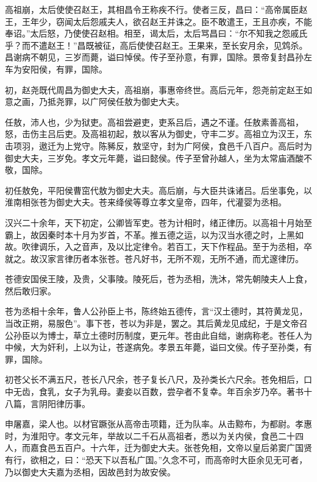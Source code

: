 \documentclass[12pt,UTF8]{ctexbook}
\begin{document}
高祖崩，太后使使召赵王，其相昌令王称疾不行。使者三反，昌曰：“高帝属臣赵王，王年少，窃闻太后怨戚夫人，欲召赵王并诛之。臣不敢遣王，王且亦疾，不能奉诏。”太后怒，乃使使召赵相。相至，谒太后，太后骂昌曰：“尔不知我之怨戚氏乎？而不遣赵王！”昌既被征，高后使使召赵王。王果来，至长安月余，见鸩杀。昌谢病不朝见，三岁而薨，谥曰悼侯。传子至孙意，有罪，国除。景帝复封昌孙左车为安阳侯，有罪，国除。



初，赵尧既代周昌为御史大夫，高祖崩，事惠帝终世。高后元年，怨尧前定赵王如意之画，乃抵尧罪，以广阿侯任敖为御史大夫。



任敖，沛人也，少为狱吏。高祖尝避吏，吏系吕后，遇之不谨。任敖素善高祖，怒，击伤主吕后吏。及高祖初起，敖以客从为御史，守丰二岁。高祖立为汉王，东击项羽，遨迁为上党守。陈豨反，敖坚守，封为广阿侯，食邑千八百户。高后时为御史大夫，三岁免。孝文元年薨，谥曰懿侯。传子至曾孙越人，坐为太常庙酒酸不敬，国除。



初任敖免，平阳侯曹窋代敖为御史大夫。高后崩，与大臣共诛诸吕。后坐事免，以淮南相张苍为御史大夫。苍来绛侯等尊立孝文皇帝，四年，代灌婴为丞相。



汉兴二十余年，天下初定，公卿皆军吏。苍为计相时，绪正律历。以高祖十月始至霸上，故因秦时本十月为岁首，不革。推五德之运，以为汉当水德之时，上黑如故。吹律调乐，入之音声，及以比定律令。若百工，天下作程品。至于为丞相，卒就之。故汉家言律历者本张苍。苍凡好书，无所不观，无所不通，而尤邃律历。



苍德安国侯王陵，及贵，父事陵。陵死后，苍为丞相，洗沐，常先朝陵夫人上食，然后敢归家。



苍为丞相十余年，鲁人公孙臣上书，陈终始五德传，言“汉土德时，其符黄龙见，当改正朔，易服色”。事下苍，苍以为非是，罢之。其后黄龙见成纪，于是文帝召公孙臣以为博士，草立土德时历制度，更元年。苍由此自绌，谢病称老。苍任人为中候，大为奸利，上以为让，苍遂病免。孝景五年薨，谥曰文侯。传子至孙类，有罪，国除。



初苍父长不满五尺，苍长八尺余，苍子复长八尺，及孙类长六尺余。苍免相后，口中无齿，食乳，女子为乳母。妻妾以百数，尝孕者不复幸。年百余岁乃卒。著书十八篇，言阴阳律历事。



申屠嘉，梁人也。以材官蹶张从高帝击项籍，迁为队率。从击黥布，为都尉。孝惠时，为淮阳守。孝文元年，举故以二千石从高祖者，悉以为关内侯，食邑二十四人，而嘉食邑五百户。十六年，迁为御史大夫。张苍免相，文帝以皇后弟窦广国贤有行，欲相之，曰：“恐天下以吾私广国。”久念不可，而高帝时大臣余见无可者，乃以御史大夫嘉为丞相，因故邑封为故安侯。
\end{document}
